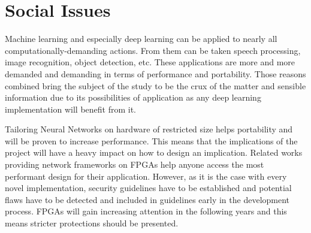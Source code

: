 
\section{Social Issues}

Machine learning and especially deep learning can be applied to nearly all computationally-demanding actions. From them can be taken speech processing, image recognition, object detection, etc. These applications are more and more demanded and demanding in terms of performance and portability. Those reasons combined bring the subject of the study to be the crux of the matter and sensible information due to its possibilities of application as any deep learning implementation will benefit from it.

Tailoring Neural Networks on hardware of restricted size helps portability and will be proven to increase performance. This means that the implications of the project will have a heavy impact on how to design an implication. Related works providing network frameworks on FPGAs \cite{} help anyone access the most performant design for their application. However, as it is the case with every novel implementation, security guidelines have to be established and potential flaws have to be detected and included in guidelines early in the development process. FPGAs will gain increasing attention in the following years and this means stricter protections should be presented.
